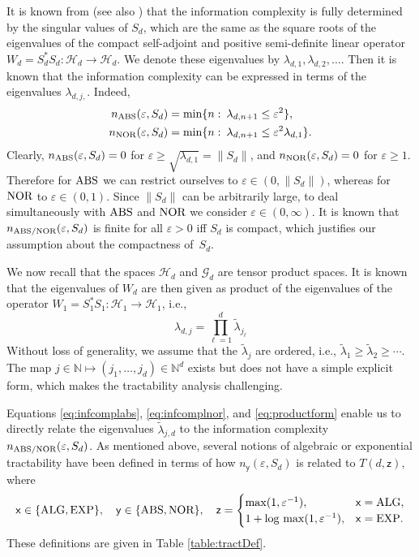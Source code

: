 \documentclass[graybox]{svmult}
\newcommand{\tlambda}{\widetilde{\lambda}}
\newcommand{\naturals}{\mathbb{N}}
\newcommand{\ALG}{\textup{ALG}\xspace}
\newcommand{\EXP}{\textup{EXP}\xspace}
\newcommand{\NOR}{\textup{NOR}\xspace}
\newcommand{\ABS}{\textup{ABS}\xspace}
\newcommand{\calG}{{\mathcal{G}}}
\newcommand{\calH}{{\mathcal{H}}}
\begin{document}
It is known from \cite{TWW88} (see also \cite{NW08})   
that the information complexity is fully determined by    
the singular values of $S_d$, which    
are the same as the square roots of the eigenvalues of    
the compact self-adjoint and positive semi-definite   
linear   
operator $W_d=S_d^\ast S_d:\calH_d\rightarrow\calH_d$.    
We denote these eigenvalues by $\lambda_{d,1}, \lambda_{d,2},\ldots$. Then it is known that 
the information complexity can be expressed in terms of the eigenvalues $\lambda_{d,j,}$. Indeed, 
\begin{align}   
n_{\ABS}(\varepsilon, S_d)   
&=\min\{n\,\colon\,\lambda_{d,n+1}\le   
\varepsilon^2\},
\label{eq:infcomplabs}\\   
n_{\NOR}(\varepsilon, S_d)&=   
\min\{n\,\colon\,\lambda_{d,n+1}\le \varepsilon^2 \lambda_{d,1}\}. 
\label{eq:infcomplnor}     
\end{align}
Clearly,    
$n_{\ABS}(\varepsilon, S_d)=0$ for $\varepsilon\ge   
\sqrt{\lambda_{d,1}}=\|S_d\|$, and    
$n_{\NOR}(\varepsilon, S_d)=0$ for $\varepsilon\ge1$.   
Therefore for $\ABS$ we can restrict ourselves to $\varepsilon\in(0,\|S_d\|)$,   
whereas for $\NOR$ to $\varepsilon\in(0,1)$.   
Since $\|S_d\|$ can be arbitrarily large, to deal simultaneously    
with $\ABS$ and $\NOR$ we consider $\varepsilon\in(0,\infty)$.    
It is known that $n_{\ABS/\NOR}(\varepsilon,S_d)$ is finite for all   
$\varepsilon>0$ iff $S_d$ is compact, which justifies our assumption   
about the compactness of~$S_d$.   

We now recall that the spaces $\calH_d$ and $\calG_d$ are tensor product
spaces. It is known that the eigenvalues of $W_d$ are then given as product 
of the eigenvalues of the operator $W_1=S_1^\ast S_1:\calH_1\rightarrow\calH_1$, i.e.,
\begin{equation}\label{eq:productform}
\lambda_{d,j}=\prod_{\ell=1}^d \tlambda_{j_\ell}
\end{equation}
Without loss of generality, we assume that the $\tlambda_j$ are ordered, i.e., $\tlambda_1\ge \tlambda_2 \ge \cdots$. The map $j \in \naturals \mapsto (j_1, \ldots, j_d) \in \naturals^d$ exists but does not have a simple explicit form, which makes the tractability analysis challenging.
   
Equations \eqref{eq:infcomplabs}, \eqref{eq:infcomplnor}, and \eqref{eq:productform} enable us to directly relate the 
eigenvalues $\tlambda_{j,d}$ to the information complexity $n_{\ABS/\NOR}(\varepsilon, S_d)$. As mentioned above, several notions of algebraic or exponential tractability have been defined in terms of how $n_{\mathsf{y}}(\varepsilon, S_d)$ is related to $T(d,\mathsf{z})$, where 
\begin{equation*}
\mathsf{x} \in \{\ALG, \EXP \}, \quad
\mathsf{y} \in \{\ABS, \NOR \}, \quad
\mathsf{z} = \begin{cases} \max(1,\varepsilon^{-1}), & \mathsf{x} = \ALG, \\
1+\log\, \max(1,\varepsilon^{-1}), & \mathsf{x} = \EXP.\end{cases}
\end{equation*}
These definitions are given in Table \ref{table:tractDef}.
\end{document}
